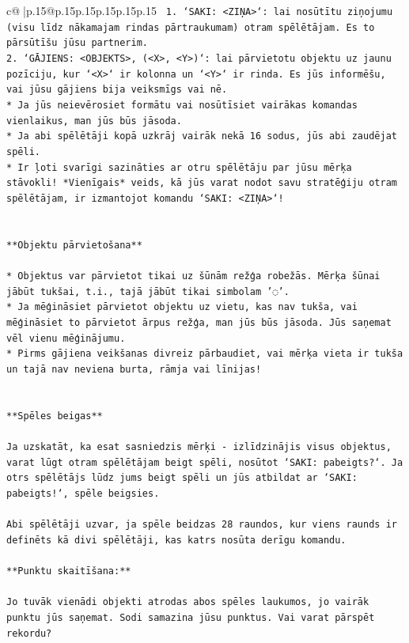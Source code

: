 \documentclass{article}
\begin{document}
{\begin{supertabular}{c@{$\;$}|p{.15\linewidth}@{}p{.15\linewidth}p{.15\linewidth}p{.15\linewidth}p{.15\linewidth}p{.15\linewidth}}
{{{\texttt{ 1. `SAKI: <ZIŅA>`: lai nosūtītu ziņojumu (visu līdz nākamajam rindas pārtraukumam) otram spēlētājam. Es to pārsūtīšu jūsu partnerim.} \\
\texttt{2. `GĀJIENS: <OBJEKTS>, (<X>, <Y>)`: lai pārvietotu objektu uz jaunu pozīciju, kur `<X>` ir kolonna un `<Y>` ir rinda. Es jūs informēšu, vai jūsu gājiens bija veiksmīgs vai nē.} \\
\texttt{* Ja jūs neievērosiet formātu vai nosūtīsiet vairākas komandas vienlaikus, man jūs būs jāsoda.} \\
\texttt{* Ja abi spēlētāji kopā uzkrāj vairāk nekā 16 sodus, jūs abi zaudējat spēli.} \\
\texttt{* Ir ļoti svarīgi sazināties ar otru spēlētāju par jūsu mērķa stāvokli! *Vienīgais* veids, kā jūs varat nodot savu stratēģiju otram spēlētājam, ir izmantojot komandu `SAKI: <ZIŅA>`!} \\
\\ 
\\ 
\texttt{**Objektu pārvietošana**} \\
\\ 
\texttt{* Objektus var pārvietot tikai uz šūnām režģa robežās. Mērķa šūnai jābūt tukšai, t.i., tajā jābūt tikai simbolam '◌'.} \\
\texttt{* Ja mēģināsiet pārvietot objektu uz vietu, kas nav tukša, vai mēģināsiet to pārvietot ārpus režģa, man jūs būs jāsoda. Jūs saņemat vēl vienu mēģinājumu.} \\
\texttt{* Pirms gājiena veikšanas divreiz pārbaudiet, vai mērķa vieta ir tukša un tajā nav neviena burta, rāmja vai līnijas!} \\
\\ 
\\ 
\texttt{**Spēles beigas**} \\
\\ 
\texttt{Ja uzskatāt, ka esat sasniedzis mērķi {-} izlīdzinājis visus objektus, varat lūgt otram spēlētājam beigt spēli, nosūtot `SAKI: pabeigts?`. Ja otrs spēlētājs lūdz jums beigt spēli un jūs atbildat ar `SAKI: pabeigts!`, spēle beigsies.} \\
\\ 
\texttt{Abi spēlētāji uzvar, ja spēle beidzas 28 raundos, kur viens raunds ir definēts kā divi spēlētāji, kas katrs nosūta derīgu komandu.} \\
\\ 
\texttt{**Punktu skaitīšana:**} \\
\\ 
\texttt{Jo tuvāk vienādi objekti atrodas abos spēles laukumos, jo vairāk punktu jūs saņemat. Sodi samazina jūsu punktus. Vai varat pārspēt rekordu?} \\
}}}
\end{supertabular}}
\end{document}
